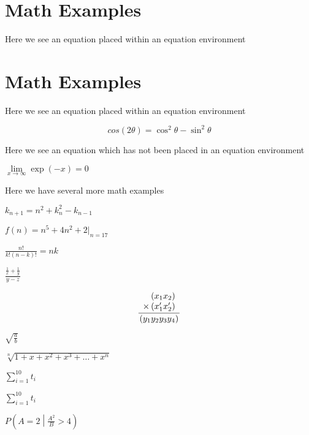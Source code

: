 \section{Math Examples}

Here we see an equation placed within an equation environment\par

\section{Math Examples}

Here we see an equation placed within an equation environment\par
\begin{equation}
cos (2\theta) = {\cos^2}\theta - \sin^2 \theta
\end{equation}

Here we see an equation which has not been placed in an equation environment\par
$
\lim\limits_{x \to \infty} \exp(-x) = 0
$

Here we have several more math examples\par
$
k_{n+1} = n^2 + k_n^2 - k_{n-1}
$

$
f(n) = n^5 + 4n^2 + 2 |_{n=17}
$

$
\frac{n!}{k!(n-k)!} = {n}{k}
$

$\frac{\frac{1}{x}+\frac{1}{y}}{y-z}$

\begin{equation}
\frac{
    \begin{array}[b]{r}
      \left( x_1 x_2 \right)\\
      \times \left( x'_1 x'_2 \right)
    \end{array}
  }{
    \left( y_1y_2y_3y_4 \right)
  }
\end{equation}

$\sqrt{\frac{a}{b}}$

$\sqrt[n]{1+x+x^2+x^3+\dots+x^n}$

$\sum_{i=1}^{10} t_i$

$\displaystyle\sum_{i=1}^{10} t_i$

$P\left(A=2\middle|\frac{A^2}{B}>4\right)$






